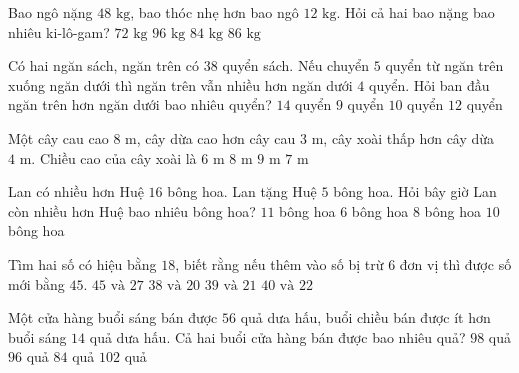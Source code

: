 \begin{ex} %
Bao ngô nặng $48\text{ kg}$, bao thóc nhẹ hơn bao ngô $12\text{ kg}$. Hỏi cả hai bao nặng bao nhiêu ki-lô-gam?
\choice
{$72\text{ kg}$}
{$96\text{ kg}$}
{\True $84\text{ kg}$}
{$86\text{ kg}$}
\end{ex}

\begin{ex} %
Có hai ngăn sách, ngăn trên có $38$ quyển sách. Nếu chuyển $5$ quyển từ ngăn trên xuống ngăn dưới thì ngăn trên vẫn nhiều hơn ngăn dưới $4$ quyển. Hỏi ban đầu ngăn trên hơn ngăn dưới bao nhiêu quyển?
\choice
{\True $14$ quyển}
{$9$ quyển}
{$10$ quyển}
{$12$ quyển}
\end{ex}

\begin{ex} %
Một cây cau cao $8\text{ m}$, cây dừa cao hơn cây cau $3\text{ m}$, cây xoài thấp hơn cây dừa $4\text{ m}$. Chiều cao của cây xoài là
\choice
{$6\text{ m}$}
{$8\text{ m}$}
{$9\text{ m}$}
{\True $7\text{ m}$}
\end{ex}

\begin{ex} %
Lan có nhiều hơn Huệ $16$ bông hoa. Lan tặng Huệ $5$ bông hoa. Hỏi bây giờ Lan còn nhiều hơn Huệ bao nhiêu bông hoa?
\choice
{$11$ bông hoa}
{\True $6$ bông hoa}
{$8$ bông hoa}
{$10$ bông hoa}
\end{ex}

\begin{ex} %
Tìm hai số có hiệu bằng $18$, biết rằng nếu thêm vào số bị trừ $6$ đơn vị thì được số mới bằng $45$.
\choice
{$45\text{ và } 27$}
{$38\text{ và } 20$}
{\True $39\text{ và } 21$}
{$40\text{ và } 22$}
\end{ex}

\begin{ex} %
Một cửa hàng buổi sáng bán được $56$ quả dưa hấu, buổi chiều bán được ít hơn buổi sáng $14$ quả dưa hấu. Cả hai buổi cửa hàng bán được bao nhiêu quả?
\choice
{\True $98$ quả}
{$96$ quả}
{$84$ quả}
{$102$ quả}
\end{ex}

